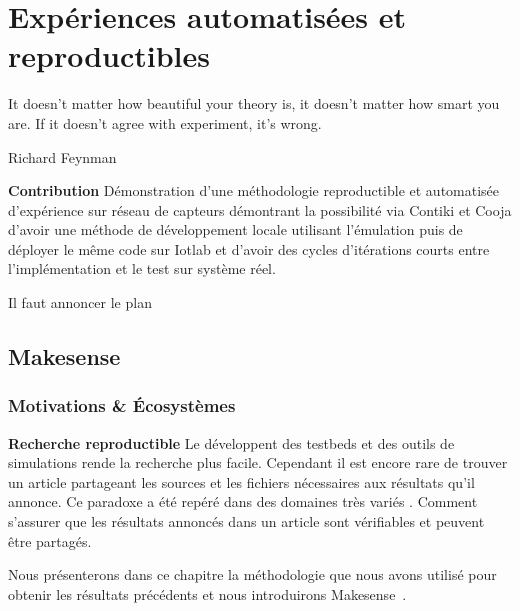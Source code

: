 
\chapter{Expériences automatisées et reproductibles} %
\label{cha:automated_and_reproducible_experiments}

\epigraph{It doesn't matter how beautiful your theory is, it doesn't matter how smart you are. If it doesn't agree with experiment, it's wrong.}{Richard Feynman}

\minitoc

\textbf{Contribution} Démonstration d'une méthodologie reproductible et
automatisée d'expérience sur réseau de capteurs démontrant la possibilité via
Contiki et Cooja d'avoir une méthode de développement locale utilisant
l'émulation puis de déployer le même code sur Iotlab et d'avoir des cycles
d'itérations courts entre l'implémentation et le test sur système réel.

Il faut annoncer le plan


\section{Makesense} %
\label{sec:makesense}


\subsection{Motivations \& Écosystèmes} %
\label{sec:automation_motivation}

\textbf{Recherche reproductible} Le développent des testbeds et des outils de
simulations rende la recherche plus facile. Cependant il est encore rare de
trouver un article partageant les sources et les fichiers nécessaires aux
résultats qu'il annonce. Ce paradoxe a été repéré dans des domaines très
variés \cite{peng2011reproducible, wilson2014best}. Comment s'assurer que les
résultats annoncés dans un article sont vérifiables et peuvent être partagés.

Nous présenterons dans ce chapitre la méthodologie que nous avons utilisé pour
obtenir les résultats précédents et nous introduirons
Makesense~\cite{leone2013makesense}.

